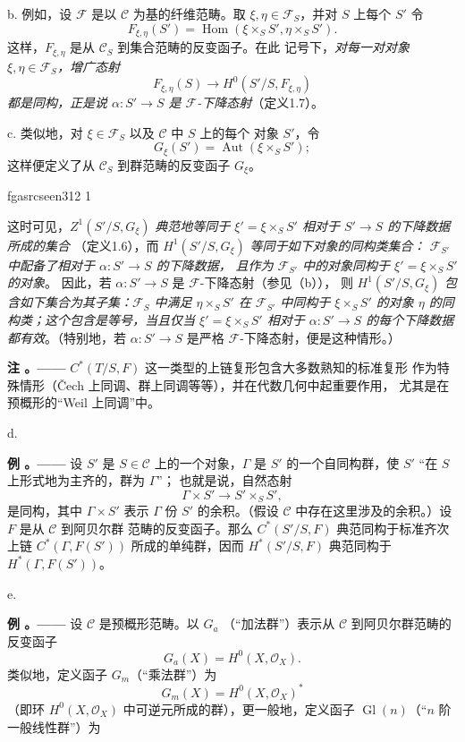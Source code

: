 \documentclass[12pt,twoside,openany]{book}
\numberwithin{equation}{section}
\newcommand{\fgaunitid}{unbound}
\newcommand{\src}[1]{%
  \phantomsection
  \hypertarget{src:\fgaunitid:#1}{}%
  \hypertarget{fga.\fgaunitid.p#1}{}%
  \ifcsname fgasrcseen#1\endcsname\else
    \expandafter\gdef\csname fgasrcseen#1\endcsname{1}%
    \hypertarget{src:#1}{}%
  \fi
  \marginpar{\raggedleft\footnotesize\sffamily #1}%
}
\newcommand{\fquote}[1]{“#1”}
\theoremstyle{plain}
\theoremstyle{definition}
\theoremstyle{remark}
\newcommand{\result}[2]{%
  \par\medskip\noindent\textbf{#1%
  \if\relax\detokenize{#2}\relax\else\space#2\fi。——}\enspace
}
\begin{document}
\medskip\noindent
b. 例如，设 $\mathcal F$ 是以 $\mathcal C$ 为基的纤维范畴。取
$\xi,\eta\in\mathcal F_S$，并对 $S$ 上每个 $S'$ 令
\[
  F_{\xi,\eta}(S')=
  \operatorname{Hom}(\xi\times_SS',\eta\times_SS').
\]
这样，$F_{\xi,\eta}$ 是从 $\mathcal C_S$ 到集合范畴的反变函子。在此
记号下，\emph{对每一对对象 $\xi,\eta\in\mathcal F_S$，增广态射}
\[
  F_{\xi,\eta}(S)\longrightarrow H^0(S'/S,F_{\xi,\eta})
\]
\emph{都是同构，正是说 $\alpha:S'\longrightarrow S$ 是
$\mathcal F$-下降态射}（定义1.7）。

\medskip\noindent
c. 类似地，对 $\xi\in\mathcal F_S$ 以及 $\mathcal C$ 中 $S$ 上的每个
对象 $S'$，令
\[
  G_\xi(S')=\operatorname{Aut}(\xi\times_SS') ;
\]
这样便定义了从 $\mathcal C_S$ 到群范畴的反变函子 $G_\xi$。

\src{312}
这时可见，$Z^1(S'/S,G_\xi)$ \emph{典范地等同于
$\xi'=\xi\times_SS'$ 相对于 $S'\longrightarrow S$ 的下降数据所成的集合}
（定义1.6），而 $H^1(S'/S,G_\xi)$ \emph{等同于如下对象的同构类集合：
$\mathcal F_{S'}$ 中配备了相对于 $\alpha:S'\longrightarrow S$ 的下降数据，
且作为 $\mathcal F_{S'}$ 中的对象同构于 $\xi'=\xi\times_SS'$ 的对象}。
因此，若 $\alpha:S'\longrightarrow S$ 是 $\mathcal F$-下降态射（参见（b）），
则 $H^1(S'/S,G_\xi)$ \emph{包含如下集合为其子集：$\mathcal F_S$ 中满足
$\eta\times_SS'$ 在 $\mathcal F_{S'}$ 中同构于 $\xi\times_SS'$ 的对象
$\eta$ 的同构类；这个包含是等号，当且仅当
$\xi'=\xi\times_SS'$ 相对于 $\alpha:S'\longrightarrow S$ 的每个下降数据
都有效}。（特别地，若 $\alpha:S'\longrightarrow S$ 是严格
$\mathcal F$-下降态射，便是这种情形。）

\result{注}{} $C^*(T/S,F)$ 这一类型的上链复形包含大多数熟知的标准复形
作为特殊情形（Čech 上同调、群上同调等等），并在代数几何中起重要作用，
尤其是在预概形的\fquote{Weil 上同调}中。

\medskip\noindent
d. \result{例}{1} 设 $S'$ 是 $S\in\mathcal C$ 上的一个对象，$\Gamma$ 是
$S'$ 的一个自同构群，使 $S'$ \fquote{在 $S$ 上形式地为主齐的，群为 $\Gamma$}；
也就是说，自然态射
\[
  \Gamma\times S'\longrightarrow S'\times_SS',
\]
是同构，其中 $\Gamma\times S'$ 表示 $\Gamma$ 份 $S'$ 的余积。（假设
$\mathcal C$ 中存在这里涉及的余积。）设 $F$ 是从 $\mathcal C$ 到阿贝尔群
范畴的反变函子。那么 $C^*(S'/S,F)$ 典范同构于标准齐次上链
$C^*(\Gamma,F(S'))$ 所成的单纯群，因而 $H^*(S'/S,F)$ 典范同构于
$H^*(\Gamma,F(S'))$。

\medskip\noindent
e. \result{例}{2} 设 $\mathcal C$ 是预概形范畴。以 $G_a$
（\fquote{加法群}）表示从 $\mathcal C$ 到阿贝尔群范畴的反变函子
\[
  G_a(X)=H^0(X,\mathcal O_X).
\]
类似地，定义函子 $G_m$（\fquote{乘法群}）为
\[
  G_m(X)=H^0(X,\mathcal O_X)^*
\]
（即环 $H^0(X,\mathcal O_X)$ 中可逆元所成的群），更一般地，定义函子
$\operatorname{Gl}(n)$（\fquote{$n$ 阶一般线性群}）为
\end{document}

